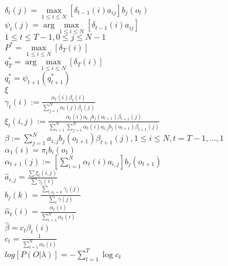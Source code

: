 $\delta_t(j) = \max\limits_{1\leq i\leq N} [\delta_{t-1}(i)a_{ij}]b_j(o_t)$\\
$\psi_t(j) = \arg \max\limits_{1\leq i\leq N} [\delta_{t-1}(i)a_{ij}]$\\
$1\leq t \leq T-1, 0 \leq j \leq N-1$\\
$P^\ast = \max\limits_{1\leq i \leq N} [\delta_T(i)]$\\
$q^\ast_T = \arg \max\limits_{1\leq i\leq N} [\delta_T(i)]$\\
$q^\ast_t = \psi_{t+1}(q^\ast_{t+1})$ \\
$\xi$\\
$\gamma_t(i) := \frac{\alpha_t(i)\beta_t(i)}{\sum_{j=1}^{N} \alpha_t(j)\beta_t(j)} $\\
$\xi_t(i,j) := \frac{\alpha_t(i)a_{i,j}b_j(o_{t+1})\beta_{t+1}(j)}
                {\sum_{i=1}^{N} \sum_{j=1}^{N} \alpha_t(i)a_{i,j}b_j(o_{t+1})\beta_{t+1}(j)} $\\$\beta := \sum_{j=1}^{N} a_{i,j}b_j(o_{t+1})\beta_{t+1}(j), 1 \leq i \leq N, t = T-1,...,1 $\\
$\alpha_1(i) = \pi_ib_i(o_1)$\\
$\alpha_{t+1}(j) := [\sum_{i=1}^{N} \alpha_t(i)a_{i,j}]b_j(o_{t+1}) $\\
$\hat{a}_{i,j} = \frac{\sum \xi_t(i,j)}{\sum \gamma_t(i)}$\\
$\hat{b}_j(k) = \frac{\sum_{t,o_t=k} \gamma_t(j)}{\sum_t \gamma(j)}$\\
$\hat{\alpha}_t(i) = \frac{\alpha_t(i)}{\sum_{i=1}^{N}\alpha_t(i)}$\\
$\hat{\beta} = c_t\beta_t(i)$\\
$c_t = \frac{1}{\sum_{i=1}^{N}\alpha_t(i)}$\\
$log[P(O|\lambda)]= - \sum_{t=1}^{T}\log c_t$\\